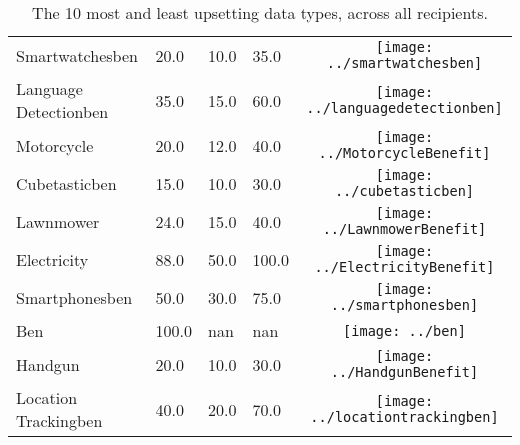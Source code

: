 \begin{table}[t]
\begin{center}
\begin{tabular}{| p{2cm} | p{1cm} | p{1cm} | p{1cm} | c |}
Smartwatchesben & 20.0 & 10.0 & 35.0 & \texttt{[image: ../smartwatchesben]} \\ 
Language Detectionben & 35.0 & 15.0 & 60.0 & \texttt{[image: ../languagedetectionben]} \\ 
Motorcycle & 20.0 & 12.0 & 40.0 & \texttt{[image: ../MotorcycleBenefit]} \\ 
Cubetasticben & 15.0 & 10.0 & 30.0 & \texttt{[image: ../cubetasticben]} \\ 
Lawnmower & 24.0 & 15.0 & 40.0 & \texttt{[image: ../LawnmowerBenefit]} \\ 
Electricity & 88.0 & 50.0 & 100.0 & \texttt{[image: ../ElectricityBenefit]} \\ 
Smartphonesben & 50.0 & 30.0 & 75.0 & \texttt{[image: ../smartphonesben]} \\ 
Ben & 100.0 & nan & nan & \texttt{[image: ../ben]} \\ 
Handgun & 20.0 & 10.0 & 30.0 & \texttt{[image: ../HandgunBenefit]} \\ 
Location Trackingben & 40.0 & 20.0 & 70.0 & \texttt{[image: ../locationtrackingben]} \\ 
\hline
\end{tabular}
\caption{The 10 most and least upsetting data types, across all recipients.}
\label{top10}
\end{center}
\end{table}
